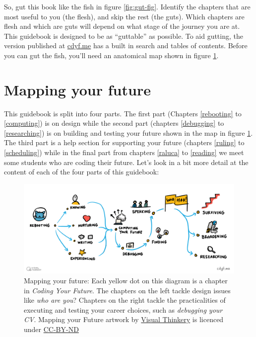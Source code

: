 \documentclass[
]{book}
\begin{document}
So, gut this book like the fish in figure \ref{fig:gut-fig}. Identify the chapters that are most useful to you (the flesh), and skip the rest (the guts). Which chapters are flesh and which are guts will depend on what stage of the journey you are at. This guidebook is designed to be as ``guttable'' as possible. To aid gutting, the version published at \href{https://www.cdyf.me/}{cdyf.me} has a built in search and tables of contents. Before you can gut the fish, you'll need an anatomical map shown in figure \ref{fig:map-fig}.

\hypertarget{mapping}{%
\section{Mapping your future}\label{mapping}}

This guidebook is split into four parts. The first part (Chapters \ref{rebooting} to \ref{computing}) is on design while the second part (chapters \ref{debugging} to \ref{researching}) is on building and testing your future shown in the map in figure \ref{fig:map-fig}. The third part is a help section for supporting your future (chapters \ref{ruling} to \ref{scheduling}) while in the final part from chapters \ref{raluca} to \ref{reading} we meet some students who are coding their future. Let's look in a bit more detail at the content of each of the four parts of this guidebook:

\begin{figure}

{\centering \includegraphics[width=1\linewidth]{images/Course Map V3} 

}

\caption{Mapping your future: Each yellow dot on this diagram is a chapter in \emph{Coding Your Future}. The chapters on the left tackle design issues like \emph{who are you}? Chapters on the right tackle the practicalities of executing and testing your career choices, such as \emph{debugging your CV}. Mapping your Future artwork by \href{https://visualthinkery.com/}{Visual Thinkery} is licenced under \href{https://creativecommons.org/licenses/by-nd/4.0/}{CC-BY-ND}}\label{fig:map-fig}
\end{figure}
\end{document}
